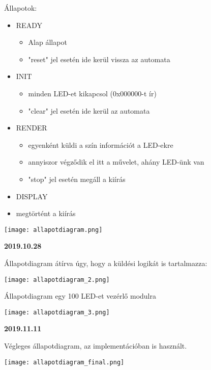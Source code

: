 \documentclass[10pt]{article} %
\begin{document}
Állapotok:
\begin{itemize}
\item READY
	\begin{itemize}
	\item Alap állapot 
	\item "reset" jel esetén ide kerül vissza az automata
	\end{itemize}
\item INIT
	\begin{itemize}
	\item minden LED-et kikapcsol (0x000000-t ír)
	\item "clear" jel esetén ide kerül az automata
	\end{itemize}
\item RENDER
	\begin{itemize}
	\item egyenként küldi a szín információt a LED-ekre
	\item annyiszor végződik el itt a művelet, ahány LED-ünk van
	\item "stop" jel esetén megáll a kiírás
	\end{itemize}
\item DISPLAY
	\item megtörtént a kiírás
\end{itemize}

\texttt{[image: allapotdiagram.png]}

\textbf{2019.10.28}

Állapotdiagram átírva úgy, hogy a küldési logikát is tartalmazza:

\texttt{[image: allapotdiagram\_2.png]}

Állapotdiagram egy 100 LED-et vezérlő modulra

\texttt{[image: allapotdiagram\_3.png]}

\textbf{2019.11.11}

Végleges állapotdiagram, az implementációban is használt.

\texttt{[image: allapotdiagram\_final.png]}
\end{document}
